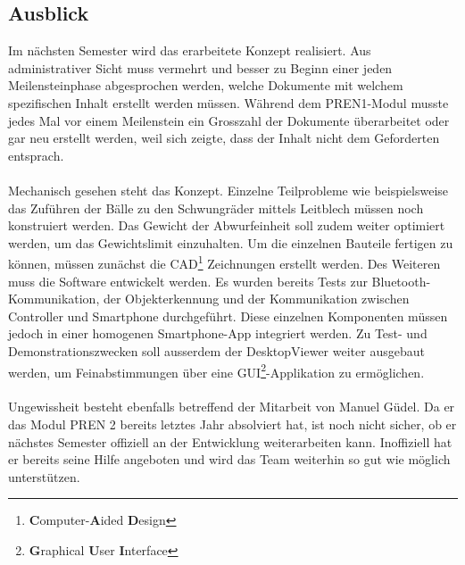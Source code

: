 \subsection{Ausblick}
Im nächsten Semester wird das erarbeitete Konzept realisiert. Aus administrativer 
Sicht muss vermehrt und besser zu Beginn einer jeden Meilensteinphase abgesprochen 
werden, welche Dokumente mit welchem spezifischen Inhalt erstellt werden müssen. 
Während dem PREN1-Modul musste jedes Mal vor einem Meilenstein ein Grosszahl der 
Dokumente überarbeitet oder gar neu erstellt werden, weil sich zeigte, dass der 
Inhalt nicht dem Geforderten entsprach.\\
\\
Mechanisch gesehen steht das Konzept. Einzelne Teilprobleme wie beispielsweise 
das Zuführen der Bälle zu den Schwungräder mittels Leitblech müssen noch konstruiert 
werden. Das Gewicht der Abwurfeinheit soll zudem weiter optimiert werden, um das 
Gewichtslimit einzuhalten. Um die einzelnen Bauteile fertigen zu können, müssen 
zunächst die CAD\footnote{\textbf{C}omputer-\textbf{A}ided \textbf{D}esign} Zeichnungen erstellt werden. Des Weiteren muss die Software 
entwickelt werden. Es wurden bereits Tests zur Bluetooth-Kommunikation, der 
Objekterkennung und der Kommunikation zwischen Controller und Smartphone 
durchgeführt. Diese einzelnen Komponenten müssen jedoch in einer homogenen 
Smartphone-App integriert werden. Zu Test- und Demonstrationszwecken soll ausserdem 
der DesktopViewer weiter ausgebaut werden, um Feinabstimmungen über eine 
GUI\footnote{\textbf{G}raphical  \textbf{U}ser \textbf{I}nterface}-Applikation zu 
ermöglichen.\\
\\
Ungewissheit besteht ebenfalls betreffend der Mitarbeit von Manuel Güdel. Da er 
das Modul PREN 2 bereits letztes Jahr absolviert hat, ist noch nicht sicher, ob 
er nächstes Semester offiziell an der Entwicklung weiterarbeiten kann. Inoffiziell 
hat er bereits seine Hilfe angeboten und wird das Team weiterhin so gut wie möglich 
unterstützen.
